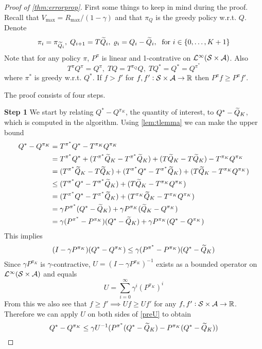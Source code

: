 \begin{proof}[Proof of \cref{thm:errorprop}] 
  First some things to keep in mind during the proof.
  Recall that $V_{\max} = R_{\max} / (1 - \gamma)$ and that
  $\pi_Q$ is the greedy policy w.r.t. $Q$.
  Denote 
  \[ \pi_i = \pi_{\widetilde{Q}_i},
    \; Q_{i+1} = T \widetilde{Q}_{i},
  \; \varrho_{i} = Q_{i} - \widetilde{Q}_{i},
\; \mbox{ for } i \in \{0,\dots,K+1\} \]
  Note that for any policy $\pi$,
  $P^{\pi}$ is linear and 1-contrative on
  $\mathcal{L}^\infty(\mathcal{S} \times \mathcal{A})$. %
  Also \[ T^{\pi} Q^{\pi} = Q^{\pi}, \;
    T Q = T^{\pi_Q} Q, \;
  T Q^* = Q^* = Q^{\pi^*} \]
  where $\pi^*$ is greedy w.r.t. $Q^*$. 
  If $f > f'$ for $f,f':\mathcal{S}\times \mathcal{A} \to \mathbb{R}$
  then $P^{\pi} f \geq P^{\pi} f'$. %
  
  The proof consists of four steps.

  \textbf{Step 1}
  We start by relating $Q^* - Q^{\pi_K}$, the quantity of interest,
  to $Q^* - \widetilde{Q}_K$, which is computed in the algorithm.
  Using \cref{lem:tlemma} we can make the upper bound
  \begin{align}
    Q^* - Q^{\pi_K} &= T^{\pi^*} Q^* - T^{\pi_K} Q^{\pi_K} \notag
    \\ &= T^{\pi^*} Q^* + (T^{\pi^*} \widetilde{Q}_K - T^{\pi^*} \widetilde{Q}_K)
    + (T \widetilde{Q}_K - T \widetilde{Q}_K)- T^{\pi_K} Q^{\pi_K} \notag
    \\ &= (T^{\pi^*} \widetilde{Q}_K - T \widetilde{Q}_K)
    + (T^{\pi^*} Q^* - T^{\pi^*} \widetilde{Q}_K) 
    + (T \widetilde{Q}_K - T^{\pi_K} Q^{\pi_K}) \notag
    \\ &\leq (T^{\pi^*} Q^* - T^{\pi^*} \widetilde{Q}_K) 
    + (T \widetilde{Q}_K - T^{\pi_K} Q^{\pi_K}) \notag
    \\ &= (T^{\pi^*} Q^* - T^{\pi^*} \widetilde{Q}_K) 
    + (T^{\pi_K} \widetilde{Q}_K - T^{\pi_K} Q^{\pi_K}) \notag
    \\ &= \gamma P^{\pi^*} (Q^* - \widetilde{Q}_K)
    + \gamma P^{\pi_K} (\widetilde{Q}_K - Q^{\pi_K}) \notag
    \\ &= \gamma (P^{\pi^*} - P^{\pi_K})(Q^* - \widetilde{Q}_K)
    + \gamma P^{\pi_K} (Q^* - Q^{\pi_K}) \label{preU}
  \end{align}
  This implies
  \[ (I - \gamma P^{\pi_K})(Q^* - Q^{\pi_K})
  \leq \gamma (P^{\pi^*} - P^{\pi_K})(Q^* - \widetilde{Q}_K) \]
  Since $\gamma P^{\pi_K}$ is $\gamma$-contractive,
  $U = (I - \gamma P^{\pi_K})^{-1}$ exists as a bounded operator on
  $\mathcal{L}^\infty(\mathcal{S}\times \mathcal{A})$ and equals
  \[ U = \sum_{i=0}^\infty \gamma^i (P^{\pi_K})^i \] 
  From this we also see that $f \geq f' \implies U f \geq U f'$ for any
  $f, f' : \mathcal{S}\times \mathcal{A} \to \mathbb{R}$.
  Therefore we can apply $U$ on both sides of \cref{preU} to obtain 
  \begin{equation} Q^* - Q^{\pi_K} \leq \gamma U^{-1}(P^{\pi^*}(Q^* - \widetilde{Q}_K)
  - P^{\pi_K} (Q^* - \widetilde{Q}_K)) \label{eq:qq1} \end{equation} 


\end{proof}
